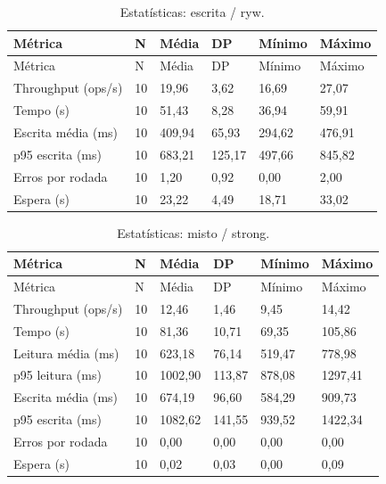 \begingroup\small\setlength{\tabcolsep}{4pt}
\begin{longtable}{llllll}
\caption{Estatísticas: escrita / ryw.}\\
\toprule
Métrica & N & Média & DP & Mínimo & Máximo\\\midrule\endfirsthead
\toprule
Métrica & N & Média & DP & Mínimo & Máximo\\\midrule\endhead
\bottomrule\endfoot
Throughput (ops/s) & 10 & 19,96 & 3,62 & 16,69 & 27,07\\
Tempo (s) & 10 & 51,43 & 8,28 & 36,94 & 59,91\\
Escrita média (ms) & 10 & 409,94 & 65,93 & 294,62 & 476,91\\
p95 escrita (ms) & 10 & 683,21 & 125,17 & 497,66 & 845,82\\
Erros por rodada & 10 & 1,20 & 0,92 & 0,00 & 2,00\\
Espera (s) & 10 & 23,22 & 4,49 & 18,71 & 33,02\\
\end{longtable}
\endgroup

\begingroup\small\setlength{\tabcolsep}{4pt}
\begin{longtable}{llllll}
\caption{Estatísticas: misto / strong.}\\
\toprule
Métrica & N & Média & DP & Mínimo & Máximo\\\midrule\endfirsthead
\toprule
Métrica & N & Média & DP & Mínimo & Máximo\\\midrule\endhead
\bottomrule\endfoot
Throughput (ops/s) & 10 & 12,46 & 1,46 & 9,45 & 14,42\\
Tempo (s) & 10 & 81,36 & 10,71 & 69,35 & 105,86\\
Leitura média (ms) & 10 & 623,18 & 76,14 & 519,47 & 778,98\\
p95 leitura (ms) & 10 & 1002,90 & 113,87 & 878,08 & 1297,41\\
Escrita média (ms) & 10 & 674,19 & 96,60 & 584,29 & 909,73\\
p95 escrita (ms) & 10 & 1082,62 & 141,55 & 939,52 & 1422,34\\
Erros por rodada & 10 & 0,00 & 0,00 & 0,00 & 0,00\\
Espera (s) & 10 & 0,02 & 0,03 & 0,00 & 0,09\\
\end{longtable}
\endgroup

